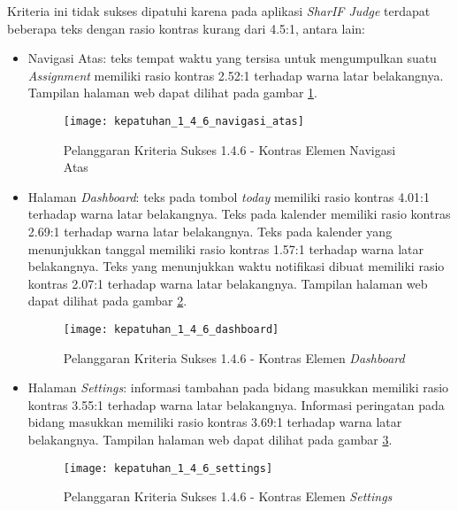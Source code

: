 Kriteria ini tidak sukses dipatuhi karena pada aplikasi \textit{SharIF Judge} terdapat beberapa teks dengan rasio kontras kurang dari 4.5:1, antara lain:
\begin{itemize}
	\item Navigasi Atas: teks tempat waktu yang tersisa untuk mengumpulkan suatu \textit{Assignment} memiliki rasio kontras 2.52:1 terhadap warna latar belakangnya. Tampilan halaman web dapat dilihat pada gambar \ref{fig:kepatuhan_1_4_6_navigasi_atas}.
	\begin{figure}[H]
		\centering  
		\texttt{[image: kepatuhan\_1\_4\_6\_navigasi\_atas]}  
		\caption[Pelanggaran Kriteria Sukses 1.4.6 - Kontras Elemen Navigasi Atas]{Pelanggaran Kriteria Sukses 1.4.6 - Kontras Elemen Navigasi Atas} 
		\label{fig:kepatuhan_1_4_6_navigasi_atas} 
	\end{figure}

	\item Halaman \textit{Dashboard}: teks pada tombol \textit{today} memiliki rasio kontras 4.01:1 terhadap warna latar belakangnya. Teks pada kalender memiliki rasio kontras 2.69:1 terhadap warna latar belakangnya. Teks pada kalender yang menunjukkan tanggal memiliki rasio kontras 1.57:1 terhadap warna latar belakangnya. Teks yang menunjukkan waktu notifikasi dibuat memiliki rasio kontras 2.07:1 terhadap warna latar belakangnya. Tampilan halaman web dapat dilihat pada gambar \ref{fig:kepatuhan_1_4_6_dashboard}.
	\begin{figure}[H]
		\centering  
		\texttt{[image: kepatuhan\_1\_4\_6\_dashboard]}  
		\caption[Pelanggaran Kriteria Sukses 1.4.6 - Kontras Elemen \textit{Dashboard}]{Pelanggaran Kriteria Sukses 1.4.6 - Kontras Elemen \textit{Dashboard}} 
		\label{fig:kepatuhan_1_4_6_dashboard} 
	\end{figure}

	\item Halaman \textit{Settings}: informasi tambahan pada bidang masukkan memiliki rasio kontras 3.55:1 terhadap warna latar belakangnya. Informasi peringatan pada bidang masukkan memiliki rasio kontras 3.69:1 terhadap warna latar belakangnya. Tampilan halaman web dapat dilihat pada gambar \ref{fig:kepatuhan_1_4_6_settings}.
	\begin{figure}[H]
		\centering  
		\texttt{[image: kepatuhan\_1\_4\_6\_settings]}  
		\caption[Pelanggaran Kriteria Sukses 1.4.6 - Kontras Elemen \textit{Settings}]{Pelanggaran Kriteria Sukses 1.4.6 - Kontras Elemen \textit{Settings}} 
		\label{fig:kepatuhan_1_4_6_settings} 
	\end{figure}


\end{itemize}
